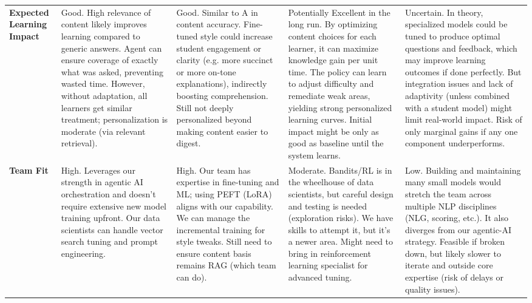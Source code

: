 \documentclass[11pt]{article}
\begin{document}
\begin{table}[h!]
\begin{tabular}{p{2.8cm} p{3.4cm} p{3.4cm} p{3.4cm} p{3.4cm}}
\textbf{Expected Learning Impact} & Good. High relevance of content likely improves learning compared to generic answers. Agent can ensure coverage of exactly what was asked, preventing wasted time. However, without adaptation, all learners get similar treatment; personalization is moderate (via relevant retrieval). & Good. Similar to A in content accuracy. Fine-tuned style could increase student engagement or clarity (e.g. more succinct or more on-tone explanations), indirectly boosting comprehension. Still not deeply personalized beyond making content easier to digest. & Potentially Excellent in the long run. By optimizing content choices for each learner, it can maximize knowledge gain per unit time. The policy can learn to adjust difficulty and remediate weak areas, yielding strong personalized learning curves. Initial impact might be only as good as baseline until the system learns. & Uncertain. In theory, specialized models could be tuned to produce optimal questions and feedback, which may improve learning outcomes if done perfectly. But integration issues and lack of adaptivity (unless combined with a student model) might limit real-world impact. Risk of only marginal gains if any one component underperforms. \\
\textbf{Team Fit} & High. Leverages our strength in agentic AI orchestration and doesn’t require extensive new model training upfront. Our data scientists can handle vector search tuning and prompt engineering. & High. Our team has expertise in fine-tuning and ML; using PEFT (LoRA) aligns with our capability. We can manage the incremental training for style tweaks. Still need to ensure content basis remains RAG (which team can do). & Moderate. Bandits/RL is in the wheelhouse of data scientists, but careful design and testing is needed (exploration risks). We have skills to attempt it, but it’s a newer area. Might need to bring in reinforcement learning specialist for advanced tuning. & Low. Building and maintaining many small models would stretch the team across multiple NLP disciplines (NLG, scoring, etc.). It also diverges from our agentic-AI strategy. Feasible if broken down, but likely slower to iterate and outside core expertise (risk of delays or quality issues). \\

\end{tabular}
\end{table}
\end{document}
